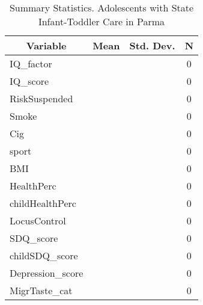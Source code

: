 
\begin{table}[htbp]\centering \caption{Summary Statistics. Adolescents with State Infant-Toddler Care in Parma \label{bothAdolasiloStatParma}}
\begin{tabular}{l c c  c}\hline\hline
\multicolumn{1}{c}{\textbf{Variable}} & \textbf{Mean}
 & \textbf{Std. Dev.} & \textbf{N}\\ \hline
IQ\_factor &  &   & 0\\
IQ\_score &  &   & 0\\
RiskSuspended &  &   & 0\\
Smoke &  &   & 0\\
Cig &  &   & 0\\
sport &  &   & 0\\
BMI &  &   & 0\\
HealthPerc &  &   & 0\\
childHealthPerc &  &   & 0\\
LocusControl &  &   & 0\\
SDQ\_score &  &   & 0\\
childSDQ\_score &  &   & 0\\
Depression\_score &  &   & 0\\
MigrTaste\_cat &  &   & 0\\
\hline\end{tabular}
\end{table}
